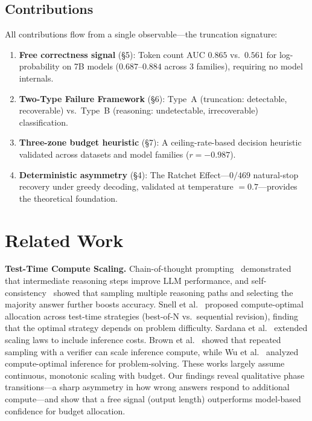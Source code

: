 \documentclass{article}
\begin{document}
\subsection{Contributions}

All contributions flow from a single observable---the truncation signature:
\begin{enumerate}
    \item \textbf{Free correctness signal} (\S5): Token count AUC $0.865$ vs.\ $0.561$ for log-probability on 7B models ($0.687$--$0.884$ across 3 families), requiring no model internals.
    \item \textbf{Two-Type Failure Framework} (\S6): Type~A (truncation: detectable, recoverable) vs.\ Type~B (reasoning: undetectable, irrecoverable) classification.
    \item \textbf{Three-zone budget heuristic} (\S7): A ceiling-rate-based decision heuristic validated across datasets and model families ($r = -0.987$).
    \item \textbf{Deterministic asymmetry} (\S4): The Ratchet Effect---$0/469$ natural-stop recovery under greedy decoding, validated at temperature $= 0.7$---provides the theoretical foundation.
\end{enumerate}

\section{Related Work}

\textbf{Test-Time Compute Scaling.}
Chain-of-thought prompting~\cite{wei2022chain} demonstrated that intermediate reasoning steps improve LLM performance, and self-consistency~\cite{wang2022self} showed that sampling multiple reasoning paths and selecting the majority answer further boosts accuracy. Snell et al.~\cite{snell2024scaling} proposed compute-optimal allocation across test-time strategies (best-of-N vs.\ sequential revision), finding that the optimal strategy depends on problem difficulty. Sardana et al.~\cite{sardana2024chinchilla} extended scaling laws to include inference costs. Brown et al.~\cite{brown2024large} showed that repeated sampling with a verifier can scale inference compute, while Wu et al.~\cite{wu2024inference} analyzed compute-optimal inference for problem-solving. These works largely assume continuous, monotonic scaling with budget. Our findings reveal qualitative phase transitions---a sharp asymmetry in how wrong answers respond to additional compute---and show that a free signal (output length) outperforms model-based confidence for budget allocation.
\end{document}

